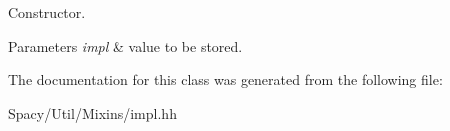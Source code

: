 Constructor. 


\begin{DoxyParams}{Parameters}
{\em impl} & value to be stored. \\
\hline
\end{DoxyParams}


The documentation for this class was generated from the following file\+:\begin{DoxyCompactItemize}
\item 
Spacy/\+Util/\+Mixins/impl.\+hh\end{DoxyCompactItemize}
